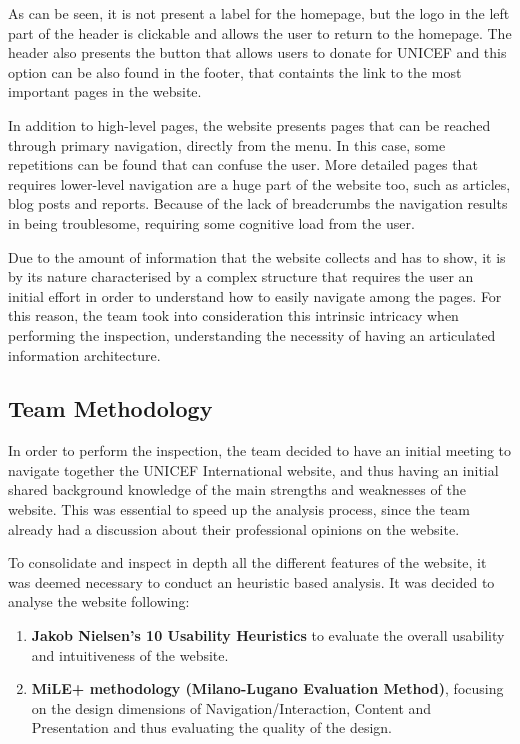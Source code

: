 As can be seen, it is not present a label for the homepage, but the logo in the left part of the header is clickable and allows the user to return to the homepage. The header also presents the button that allows users to donate for UNICEF and this option can be also found in the footer, that containts the link to the most important pages in the website.

In addition to high-level pages, the website presents pages that can be reached through primary navigation, directly from the menu. In this case, some repetitions can be found that can confuse the user.
More detailed pages that requires lower-level navigation are a huge part of the website too, such as articles, blog posts and reports. Because of the lack of breadcrumbs the navigation results in being troublesome, requiring some cognitive load from the user.

Due to the amount of information that the website collects and has to show, it is by its nature characterised by a complex structure that requires the user an initial effort in order to understand how to easily navigate among the pages. For this reason, the team took into consideration this intrinsic intricacy when performing the inspection, understanding the necessity of having an articulated information architecture.
\clearpage

\subsection{Team Methodology}
In order to perform the inspection, the team decided to have an initial meeting to navigate together the UNICEF International website, and thus having an initial shared background knowledge of the main strengths and weaknesses of the website. 
This was essential to speed up the analysis process, since the team already had a discussion about their professional opinions on the website.

To consolidate and inspect in depth all the different features of the website, it was deemed necessary to conduct an heuristic based analysis.
It was decided to analyse the website following:
\begin{enumerate}
    \item \textbf{Jakob Nielsen's 10 Usability Heuristics} to evaluate the overall usability and intuitiveness of the website.
    \item \textbf{MiLE+ methodology (Milano-Lugano Evaluation Method)}, focusing on the design dimensions of Navigation/Interaction, Content and Presentation and thus evaluating the quality of the design.
\end{enumerate}


